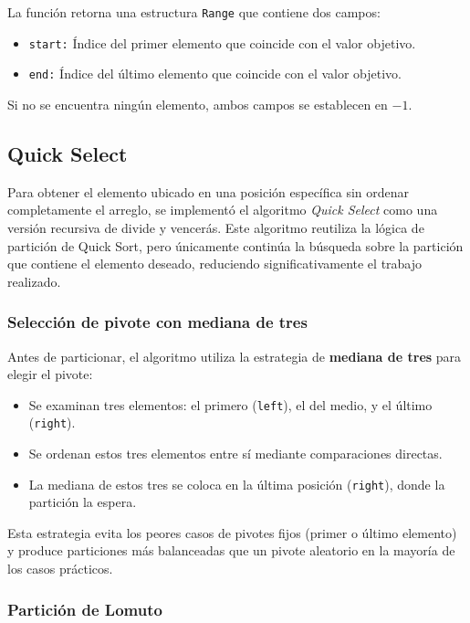 La función retorna una estructura \texttt{Range} que contiene dos campos:

\begin{itemize}
    \item \texttt{start:} Índice del primer elemento que coincide con el valor objetivo.
    \item \texttt{end:} Índice del último elemento que coincide con el valor objetivo.
\end{itemize}

Si no se encuentra ningún elemento, ambos campos se establecen en $-1$.

\subsection{Quick Select}

Para obtener el elemento ubicado en una posición específica sin ordenar completamente el arreglo, se implementó el algoritmo \textit{Quick Select} como una versión recursiva de divide y vencerás. Este algoritmo reutiliza la lógica de partición de Quick Sort, pero únicamente continúa la búsqueda sobre la partición que contiene el elemento deseado, reduciendo significativamente el trabajo realizado.

\subsubsection{Selección de pivote con mediana de tres}

Antes de particionar, el algoritmo utiliza la estrategia de \textbf{mediana de tres} para elegir el pivote:

\begin{itemize}
    \item Se examinan tres elementos: el primero (\texttt{left}), el del medio, y el último (\texttt{right}).
    \item Se ordenan estos tres elementos entre sí mediante comparaciones directas.
    \item La mediana de estos tres se coloca en la última posición (\texttt{right}), donde la partición la espera.
\end{itemize}

Esta estrategia evita los peores casos de pivotes fijos (primer o último elemento) y produce particiones más balanceadas que un pivote aleatorio en la mayoría de los casos prácticos.

\subsubsection{Partición de Lomuto}

